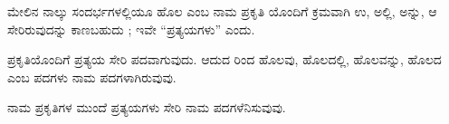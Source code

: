 \indent ಮೇಲಿನ ನಾಲ್ಕು ಸಂದರ್ಭಗಳಲ್ಲಿಯೂ ಹೊಲ ಎಂಬ ನಾಮ ಪ್ರಕೃತಿ ಯೊಂದಿಗೆ ಕ್ರಮವಾಗಿ ಉ, ಅಲ್ಲಿ, ಅನ್ನು, ಆ ಸೇರಿರುವುದನ್ನು ಕಾಣಬಹುದು ; ಇವೇ “ಪ್ರತ್ಯಯಗಳು” ಎಂದು.\par

\begin{kbvrule}
\noindent\kbvbullet\hspace{0.5em}ಪ್ರಕೃತಿಯೊಂದಿಗೆ ಪ್ರತ್ಯಯ ಸೇರಿ ಪದವಾಗುವುದು. ಆದುದ ರಿಂದ ಹೊಲವು, ಹೊಲದಲ್ಲಿ, ಹೊಲವನ್ನು, ಹೊಲದ ಎಂಬ ಪದಗಳು ನಾಮ ಪದಗಳಾಗಿರುವುವು.
\end{kbvrule}

\begin{kbvrule}
\hspace{0.5em}ನಾಮ ಪ್ರಕೃತಿಗಳ ಮುಂದೆ ಪ್ರತ್ಯಯಗಳು ಸೇರಿ ನಾಮ ಪದಗಳೆನಿಸುವುವು.
\end{kbvrule}
